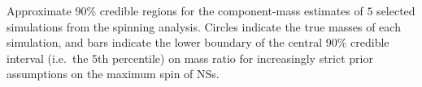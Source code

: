\label{fig:comp_masses} Approximate $90\%$ credible regions for the component-mass estimates of $5$ selected simulations from the spinning analysis.  Circles indicate the true masses of each simulation, and bars indicate the lower boundary of the central $90\%$ credible interval (i.e.\ the $5$th percentile) on mass ratio for increasingly strict prior assumptions on the maximum spin of NSs.
  
  
  
  
  
  